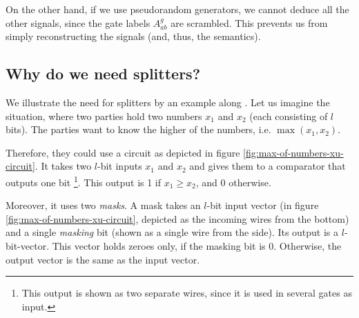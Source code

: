 On the other hand, if we use pseudorandom generators, we cannot deduce all the other signals, since the gate labels $A^g_{ab}$ are scrambled. This prevents us from simply reconstructing the signals (and, thus, the semantics).

\subsection{Why do we need splitters?}
\label{sec:appendix-splitters}

We illustrate the need for splitters by an example along \cite{Xu:2004:MAS:1023552}. Let us imagine the situation, where two parties hold two numbers $x_1$ and $x_2$ (each consisting of $l$ bits). The parties want to know the higher of the numbers, i.e. $\max(x_1,x_2)$.

Therefore, they could use a circuit as depicted in figure \ref{fig:max-of-numbers-xu-circuit}. It takes two $l$-bit inputs $x_1$ and $x_2$ and gives them to a comparator that outputs one bit \footnote{This output is shown as two separate wires, since it is used in several gates as input.}. This output is 1 if $x_1\geq x_2$, and 0 otherwise.

Moreover, it uses two \emph{masks}. A mask takes an $l$-bit input vector (in figure \ref{fig:max-of-numbers-xu-circuit}, depicted as the incoming wires from the bottom) and a single \emph{masking} bit (shown as a single wire from the side). Its output is a $l$-bit-vector. This vector holds zeroes only, if the masking bit is 0. Otherwise, the output vector is the same as the input vector.

